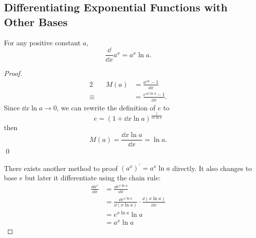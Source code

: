\subsection{Differentiating Exponential Functions with Other Bases}
For any positive constant $a$,
\[\frac\dd{\dd x}a^x=a^x\ln a.\]
\begin{proof}
  \begin{alignat*}{2}
         && M(a) & =\frac{a^{\dd x}-1}{\dd x}\\
  \equiv &&      & =\frac{e^{\dd x\ln a}-1}{\dd x}.
  \end{alignat*}
  Since $\dd x\ln a\to0$, we can rewrite the definition of $e$ to
  \[e=(1+\dd x\ln a)^\frac1{\dd x\ln a}\]
  then
  \[M(a)=\frac{\dd x\ln a}{\dd x}=\ln a.\]
  \hfill\qed

  There exists another method to proof $(a^x)^\prime=a^x\ln a$ directly. It also changes to base $e$ but later it differentiate using the chain rule:
  \begin{align*}
    \frac{\dd a^x}{\dd x} & =\frac{\dd e^{x\ln a}}{\dd x}\\
                          & =\frac{\dd e^{x\ln a}}{\dd(x\ln a)}\cdot\frac{\dd(x\ln a)}{\dd x}\\
                          & =e^{x\ln a}\ln a\\
                          & =a^x\ln a
  \end{align*}
\end{proof}


